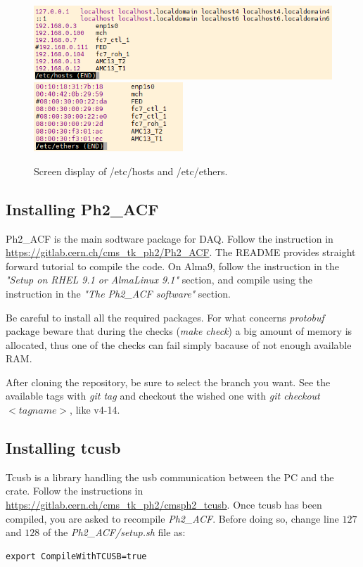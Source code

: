\documentclass[10pt,a4paper]{article}
\begin{document}
\begin{figure}[h!]
\centering
        \includegraphics[width=\textwidth]{hosts.png}
        \includegraphics[width=0.5\textwidth]{ethers.png}
  \caption{Screen display of /etc/hosts and /etc/ethers.}
  \label{GoodHosts}
\end{figure}




\subsection{Installing Ph2\_ACF}
Ph2\_ACF is the main sodtware package for DAQ.
Follow the instruction in \url{https://gitlab.cern.ch/cms_tk_ph2/Ph2_ACF}. 
The README provides straight forward tutorial to compile the code. On Alma9, follow the instruction in the \emph{"Setup on RHEL 9.1 or AlmaLinux 9.1"} section, and compile using the instruction in the \emph{"The Ph2\_ACF software"} section.

Be careful to install all the required packages. For what concerns {\it protobuf} package beware that during the checks (\emph{make check}) a big amount of memory is allocated, thus one of the checks can fail simply bacause of not enough available RAM.  

After cloning the repository, be sure to select the branch you want. See the available tags with \emph{git tag} and checkout the wished one with \emph{git checkout $<tagname>$}, like v4-14.


\subsection{Installing tcusb}
Tcusb is a library handling the usb communication between the PC and the crate.
Follow the instructions in \url{https://gitlab.cern.ch/cms_tk_ph2/cmsph2_tcusb}.
Once tcusb has been compiled, you are asked to recompile \emph{Ph2\_ACF}. Before doing so, change line $127$ and $128$ of the \emph{Ph2\_ACF/setup.sh} file as:
\begin{framed}
\begin{verbatim}
export CompileWithTCUSB=true
\end{verbatim}
\end{framed}
\end{document}
